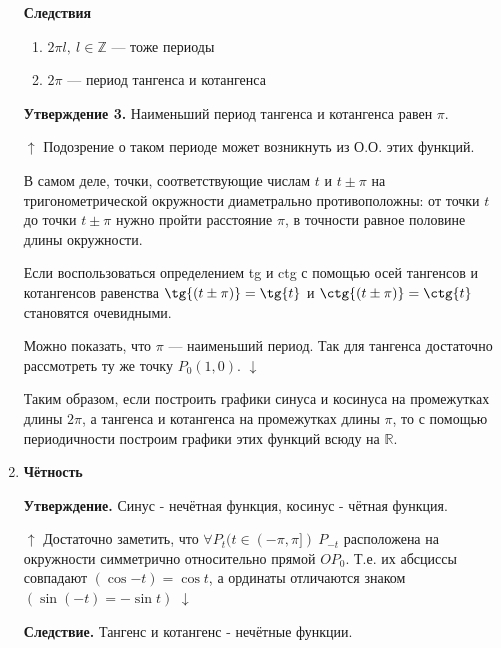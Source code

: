 \documentclass{article}
\begin{document}
\begin{enumerate}
            \textbf{Следствия}
            
            \begin{enumerate}
            \item \(2 \pi l,\ l \in \mathbb{Z}\) --- тоже периоды
            
            \item \(2 \pi\) --- период тангенса и котангенса
            
            \end{enumerate}
            
            \textbf{Утверждение 3.} Наименьший период тангенса и котангенса равен \(\pi\).
            
            \(\uparrow\) Подозрение о таком периоде может возникнуть из О.О. этих функций.
            
            В самом деле, точки, соответствующие числам \(t\) и \(t \pm \pi\) на тригонометрической окружности диаметрально противоположны: от точки \(t\) до точки \(t \pm \pi\) нужно пройти расстояние \(\pi\), в точности равное половине длины окружности.
            
            Если воспользоваться определением tg и ctg с помощью осей тангенсов и котангенсов равенства \(\tg{(t \pm \pi)} = \tg{t}\) и \(\ctg{(t \pm \pi)} = \ctg{t}\) становятся очевидными.
            
            Можно показать, что \(\pi\) --- наименьший период. Так для тангенса достаточно рассмотреть ту же точку \(P_0(1, 0)\). \(\downarrow\)
            
            Таким образом, если построить графики синуса и косинуса на промежутках длины \(2 \pi\), а тангенса и котангенса на промежутках длины \(\pi\), то с помощью периодичности построим графики этих функций всюду на \(\mathbb{R}\).
            
            \item \textbf{Чётность}
            
            \textbf{Утверждение.} Синус - нечётная функция, косинус - чётная функция.
            
            \(\uparrow\) Достаточно заметить, что \(\forall P_t(t \in (-\pi, \pi]) \ P_{-t}\) расположена на окружности симметрично относительно прямой \(OP_0\).
            Т.е. их абсциссы совпадают \((\cos{-t}) = \cos{t}\), а ординаты отличаются знаком \((\sin{(-t)} = -\sin{t})\) \(\downarrow\)
            
            \textbf{Следствие.} Тангенс и котангенс - нечётные функции.
            

\end{enumerate}
\end{document}
